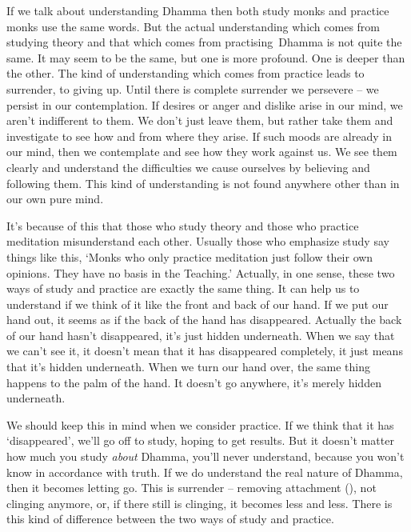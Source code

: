 If we talk about understanding Dhamma then both study monks and practice monks use the same words. But the actual understanding which comes from studying theory and that which comes from practising\linebreak\ Dhamma is not quite the same. It may seem to be the same, but one is more profound. One is deeper than the other. The kind of understanding which comes from practice leads to surrender, to giving up. Until there is complete surrender we persevere -- we persist in our contemplation. If desires or anger and dislike arise in our mind, we aren't indifferent to them. We don't just leave them, but rather take them and investigate to see how and from where they arise. If such moods are already in our mind, then we contemplate and see how they work against us. We see them clearly and understand the difficulties we cause ourselves by believing and following them. This kind of understanding is not found anywhere other than in our own pure mind.

It's because of this that those who study theory and those who practice meditation misunderstand each other. Usually those who emphasize study say things like this, `Monks who only practice meditation just follow their own opinions. They have no basis in the Teaching.' Actually, in one sense, these two ways of study and practice are exactly the same thing. It can help us to understand if we think of it like the front and back of our hand. If we put our hand out, it seems as if the back of the hand has disappeared. Actually the back of our hand hasn't disappeared, it's just hidden underneath. When we say that we can't see it, it doesn't mean that it has disappeared completely, it just means that it's hidden underneath. When we turn our hand over, the same thing happens to the palm of the hand. It doesn't go anywhere, it's merely hidden underneath.

We should keep this in mind when we consider practice. If we think that it has `disappeared', we'll go off to study, hoping to get results. But it doesn't matter how much you study \textit{about} Dhamma, you'll never understand, because you won't know in accordance with truth. If we do understand the real nature of Dhamma, then it becomes letting go. This is surrender -- removing attachment (), not clinging anymore, or, if there still is clinging, it becomes less and less. There is this kind of difference between the two ways of study and practice.

